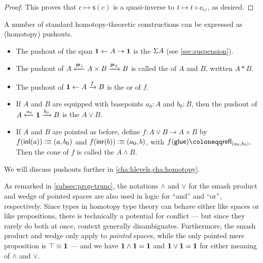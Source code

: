 \begin{proof}
This proves that $c\mapsto\mathsf{s}(c)$ is a quasi-inverse to $t\mapsto{}t\circ c_\sqcup$, as desired.
\end{proof}

A number of standard homotopy-theoretic constructions can be expressed as (homotopy) pushouts.
\begin{itemize}
\item The pushout of the span $\mathbf{1} \leftarrow A \to \mathbf{1}$ is the  $\Sigma A$ (see \autoref{sec:suspension}).%
\item The pushout of $A \xleftarrow{\mathsf{pr}_{1}} A\times B \xrightarrow{\mathsf{pr}_{2}} B$ is called the  of $A$ and $B$, written $A*B$.%
\item The pushout of $\mathbf{1} \leftarrow A \xrightarrow{f} B$ is the  or  of $f$.%
\item If $A$ and $B$ are equipped with basepoints $a_0:A$ and $b_0:B$, then the pushout of $A \xleftarrow{a_0} \mathbf{1} \xrightarrow{b_0} B$ is the  $A\vee B$.%
\item If $A$ and $B$ are pointed as before, define $f:A\vee B \to A\times B$ by $f({\mathsf{inl}}(a))\vcentcolon\equiv (a,b_0)$ and $f({\mathsf{inr}}(b))\vcentcolon\equiv (a_0,b)$, with $\ap f \glue \defid \refl{(a_0,b_0)}$.
  Then the cone of $f$ is called the  $A\wedge B$.%
\end{itemize}
We will discuss pushouts further in \autoref{cha:hlevels,cha:homotopy}.

\begin{rmk}
  As remarked in \autoref{subsec:prop-trunc}, the notations $\wedge$ and $\vee$ for the smash product and wedge of pointed spaces are also used in logic for ``and'' and ``or'', respectively.
  Since types in homotopy type theory can behave either like spaces or like propositions, there is technically a potential for conflict --- but since they rarely do both at once, context generally disambiguates.
  Furthermore, the smash product and wedge only apply to \emph{pointed} spaces, while the only pointed mere proposition is $\top\equiv\mathbf{1}$ --- and we have $\mathbf{1}\wedge \mathbf{1} = \mathbf{1}$ and $\mathbf{1}\vee\mathbf{1}=\mathbf{1}$ for either meaning of $\wedge$ and $\vee$.
\end{rmk}

%

